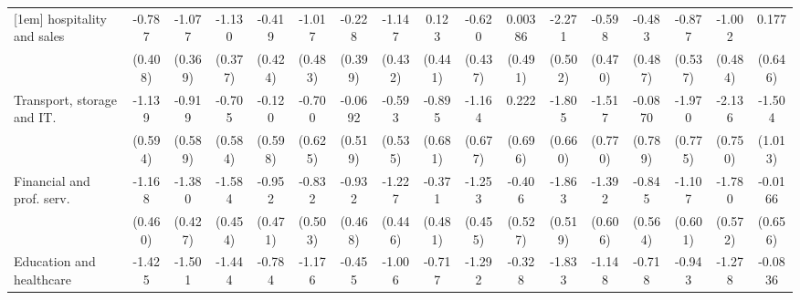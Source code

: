 {\begin{tabular}{l*{16}{c}}
[1em]
hospitality and sales&      -0.787         &      -1.077\sym{**} &      -1.130\sym{**} &      -0.419         &      -1.017\sym{*}  &      -0.228         &      -1.147\sym{**} &       0.123         &      -0.620         &     0.00386         &      -2.271\sym{***}&      -0.598         &      -0.483         &      -0.877         &      -1.002\sym{*}  &       0.177         \\
                    &     (0.408)         &     (0.369)         &     (0.377)         &     (0.424)         &     (0.483)         &     (0.399)         &     (0.432)         &     (0.441)         &     (0.437)         &     (0.491)         &     (0.502)         &     (0.470)         &     (0.487)         &     (0.537)         &     (0.484)         &     (0.646)         \\
[1em]
Transport, storage and IT.&      -1.139         &      -0.919         &      -0.705         &      -0.120         &      -0.700         &     -0.0692         &      -0.593         &      -0.895         &      -1.164         &       0.222         &      -1.805\sym{**} &      -1.517\sym{*}  &     -0.0870         &      -1.970\sym{*}  &      -2.136\sym{**} &      -1.504         \\
                    &     (0.594)         &     (0.589)         &     (0.584)         &     (0.598)         &     (0.625)         &     (0.519)         &     (0.535)         &     (0.681)         &     (0.677)         &     (0.696)         &     (0.660)         &     (0.770)         &     (0.789)         &     (0.775)         &     (0.750)         &     (1.013)         \\
[1em]
Financial and prof. serv.&      -1.168\sym{*}  &      -1.380\sym{**} &      -1.584\sym{***}&      -0.952\sym{*}  &      -0.832         &      -0.932\sym{*}  &      -1.227\sym{**} &      -0.371         &      -1.253\sym{**} &      -0.406         &      -1.863\sym{***}&      -1.392\sym{*}  &      -0.845         &      -1.107         &      -1.780\sym{**} &     -0.0166         \\
                    &     (0.460)         &     (0.427)         &     (0.454)         &     (0.471)         &     (0.503)         &     (0.468)         &     (0.446)         &     (0.481)         &     (0.455)         &     (0.527)         &     (0.519)         &     (0.606)         &     (0.564)         &     (0.601)         &     (0.572)         &     (0.656)         \\
[1em]
Education and healthcare&      -1.425\sym{**} &      -1.501\sym{***}&      -1.444\sym{***}&      -0.784         &      -1.176\sym{*}  &      -0.455         &      -1.006\sym{*}  &      -0.717         &      -1.292\sym{**} &      -0.328         &      -1.833\sym{***}&      -1.148\sym{*}  &      -0.718         &      -0.943         &      -1.278\sym{*}  &     -0.0836         \\

\end{tabular}}
